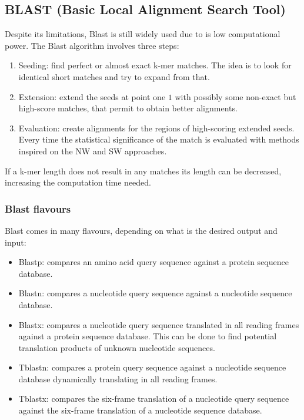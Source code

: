     \subsection{BLAST (Basic Local Alignment Search Tool)}
    Despite its limitations, Blast is still widely used due to is low computational power.
    The Blast algorithm involves three steps:

    \begin{multicols}{2}
        \begin{enumerate}
            \item Seeding: find perfect or almost exact k-mer matches.
                The idea is to look for identical short matches and try to expand from that.
            \item Extension: extend the seeds at point one $1$ with possibly some non-exact but high-score matches, that permit to obtain better alignments.
            \item Evaluation: create alignments for the regions of high-scoring extended seeds.
                Every time the statistical significance of the match is evaluated with methods inspired on the NW and SW approaches.
        \end{enumerate}
    \end{multicols}

    If a k-mer length does not result in any matches its length can be decreased, increasing the computation time needed.

        \subsubsection{Blast flavours}
        Blast comes in many flavours, depending on what is the desired output and input:

        \begin{multicols}{2}
            \begin{itemize}
                \item Blastp: compares an amino acid query sequence against a protein sequence database.
                \item Blastn: compares a nucleotide query sequence against a nucleotide sequence database.
                \item Blastx: compares a nucleotide query sequence translated in all reading frames against a protein sequence database.
                    This can be done to find potential translation products of unknown nucleotide sequences.
                \item Tblastn: compares a protein query sequence against a nucleotide sequence database dynamically translating in all reading frames.
                \item Tblastx: compares the six-frame translation of a nucleotide query sequence against the six-frame translation of a nucleotide sequence database.
            \end{itemize}
        \end{multicols}

